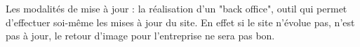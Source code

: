 Les modalités de mise à jour : la réalisation d'un "back office", outil qui permet d'effectuer soi-même les mises à jour du site.
En effet si le site n'évolue pas, n'est pas à jour, le retour d'image pour l'entreprise ne sera pas bon.
